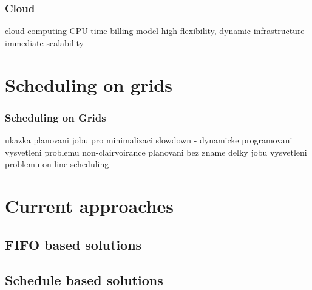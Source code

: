\begin{frame}
	\frametitle{Cloud}

	cloud computing
	CPU time billing model
	high flexibility, dynamic infrastructure
	immediate scalability
\end{frame}


\section{Scheduling on grids}

\begin{frame}
	\frametitle{Scheduling on Grids}
	ukazka planovani jobu pro minimalizaci slowdown - dynamicke programovani
	vysvetleni problemu non-clairvoirance
	planovani bez zname delky jobu
	vysvetleni problemu on-line scheduling
\end{frame}


\section{Current approaches}
\subsection{FIFO based solutions}
\subsection{Schedule based solutions}



% 





















